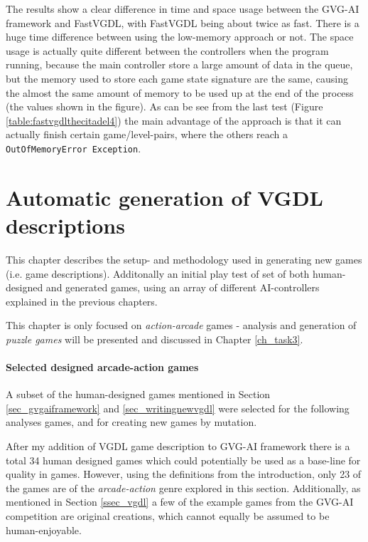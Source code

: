 \documentclass[a4paper,titlepage,final]{report}
\begin{document}
The results show a clear difference in time and space usage between the GVG-AI framework and FastVGDL, with FastVGDL being about twice as fast.
There is a huge time difference between using the low-memory approach or not.
The space usage is actually quite different between the controllers when the program running, because the main controller store a large amount of data in the queue, but the memory used to store each game state signature are the same, causing the almost the same amount of memory to be used up at the end of the process (the values shown in the figure).
As can be see from the last test (Figure \ref{table:fastvgdlthecitadel4}) the main advantage of the approach is that it can actually finish certain game/level-pairs, where the others reach a \texttt{OutOfMemoryError Exception}.


\chapter{Automatic generation of VGDL descriptions}
\label{ch_task1autogenofvgdl}
This chapter describes the setup- and methodology used in generating new games (i.e. game descriptions).
Additonally an initial play test of set of both human-designed and generated games, using an array of different AI-controllers explained in the previous chapters.

This chapter is only focused on \textit{action-arcade} games - analysis and generation of \textit{puzzle games} will be presented and discussed in Chapter \ref{ch_task3}.

\subsubsection*{Selected designed arcade-action games}
A subset of the human-designed games mentioned in Section \ref{sec_gvgaiframework} and \ref{sec_writingnewvgdl} were selected for the following analyses games, and for creating new games by mutation.

After my addition of VGDL game description to GVG-AI framework there is a total 34 human designed games which could potentially be used as a base-line for quality in games. 
However, using the definitions from the introduction, only 23 of the games are of the \textit{arcade-action} genre explored in this section. 
Additionally, as mentioned in Section \ref{ssec_vgdl} a few of the example games from the GVG-AI competition are original creations, which cannot equally be assumed to be human-enjoyable.
\end{document}
